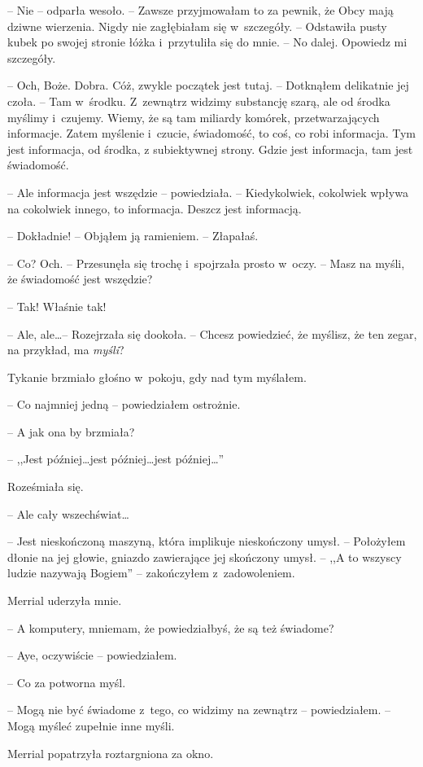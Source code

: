 \documentclass[oneside,polish,11pt,sfheadings]{mwbk}
\begin{document}
-- Nie -- odparła wesoło. -- Zawsze przyjmowałam to za pewnik, że Obcy mają
dziwne wierzenia. Nigdy nie zagłębiałam się w~szczegóły. -- Odstawiła
pusty kubek po swojej stronie łóżka i~przytuliła się do mnie. -- No
dalej. Opowiedz mi szczegóły.

-- Och, Boże. Dobra. Cóż, zwykle początek jest tutaj. -- Dotknąłem
delikatnie jej czoła. -- Tam w~środku. Z~zewnątrz widzimy substancję
szarą, ale od środka myślimy i~czujemy. Wiemy, że są tam miliardy
komórek, przetwarzających informacje. Zatem myślenie i~czucie,
świadomość, to coś, co robi informacja. Tym jest informacja, od środka,
z subiektywnej strony. Gdzie jest informacja, tam jest świadomość.

-- Ale informacja jest wszędzie -- powiedziała. -- Kiedykolwiek, cokolwiek
wpływa na cokolwiek innego, to informacja. Deszcz jest informacją.

-- Dokładnie! -- Objąłem ją ramieniem. -- Złapałaś.

-- Co? Och. -- Przesunęła się trochę i~spojrzała prosto w~oczy. -- Masz na
myśli, że świadomość jest wszędzie?

-- Tak! Właśnie tak!

-- Ale, ale\ldots -- Rozejrzała się dookoła. -- Chcesz powiedzieć, że myślisz,
że ten zegar, na przykład, ma \textit{myśli}?

Tykanie brzmiało głośno w~pokoju, gdy nad tym myślałem.

-- Co najmniej jedną -- powiedziałem ostrożnie.

-- A jak ona by brzmiała?

-- ,,Jest później\ldots jest później\ldots jest później\ldots''

Roześmiała się. 

-- Ale cały wszechświat\ldots

-- Jest nieskończoną maszyną, która implikuje nieskończony umysł. -- Położyłem dłonie na jej głowie, gniazdo zawierające jej skończony umysł.
-- ,,A to wszyscy ludzie nazywają Bogiem'' -- zakończyłem z~zadowoleniem.

Merrial uderzyła mnie.

-- A komputery, mniemam, że powiedziałbyś, że są też świadome?

-- Aye, oczywiście -- powiedziałem.

-- Co za potworna myśl.

-- Mogą nie być świadome z~tego, co widzimy na zewnątrz -- powiedziałem. -- Mogą myśleć zupełnie inne myśli.

Merrial popatrzyła roztargniona za okno.
\end{document}
